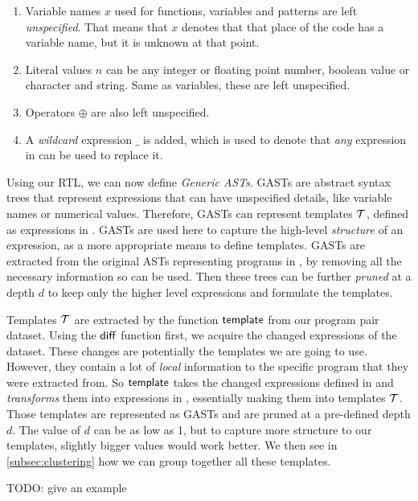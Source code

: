 \begin{enumerate}
    \item Variable names $x$ used for functions, variables and patterns are left
    \emph{unspecified}. That means that $x$ denotes that that place of the code
    has a variable name, but it is unknown at that point.
    \item Literal values $n$ can be any integer or floating point number,
    boolean value or character and string. Same as variables, these are left
    unspecified.
    \item Operators $\oplus$ are also left unspecified.
    \item A \emph{wildcard} expression $\_$ is added, which is used to denote
    that \emph{any} expression in \repairLang can be used to replace it.
\end{enumerate}

Using our RTL, we can now define \emph{Generic ASTs}. GASTs are abstract syntax
trees that represent expressions that can have unspecified details, like
variable names or numerical values. Therefore, GASTs can represent templates
$\mathcal{T}$, defined as expressions in \repairLang. GASTs are used here to capture the
high-level \emph{structure} of an expression, as a more appropriate means to
define templates. GASTs are extracted from the original ASTs representing
programs in \lang, by removing all the necessary information so \repairLang can
be used. Then these trees can be further \emph{pruned} at a depth $d$ to keep
only the higher level expressions and formulate the templates.


Templates $\mathcal{T}$ are extracted by the function $\mathsf{template}$ from our program
pair dataset. Using the $\mathsf{diff}$ function first, we acquire the changed
expressions of the dataset. These changes are potentially the templates we are
going to use. However, they contain a lot of \emph{local} information to the
specific program that they were extracted from. So $\mathsf{template}$ takes the
changed expressions defined in \lang and \emph{transforms} them into expressions
in \repairLang, essentially making them into templates $\mathcal{T}$. Those templates are
represented as GASTs and are pruned at a pre-defined depth $d$. The value of $d$
can be as low as 1, but to capture more structure to our templates, slightly
bigger values would work better. We then see in \autoref{subsec:clustering} how
we can group together all these templates.

TODO: give an example


